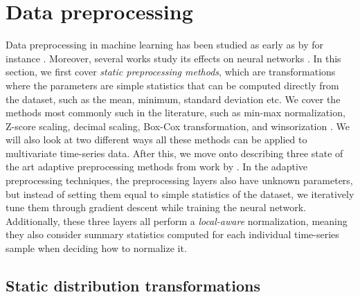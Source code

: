 \documentclass{statsmsc}
\begin{document}
{%

\section{Data preprocessing}%
\label{sec:Data preprocessing}

Data preprocessing in machine learning has been studied as early
as \citeyear{preprocess_origin} by for instance \citeauthor{preprocess_origin}.
Moreover, several works study its effects on neural networks \citep{stanislav, nawi, singh, hassan}.
In this section, we first cover \textit{static preprocessing methods}, which
are transformations where the parameters are simple statistics that can be
computed directly
from the dataset, such as the mean, minimum, standard deviation etc.
We cover the methods most commonly such in the literature, such as min-max
normalization, Z-score scaling, decimal scaling, Box-Cox transformation,
and winsorization \citep{stanislav, nawi, singh, hassan, winsorization}.
We will also look at two different ways all these methods can be applied to multivariate
time-series data.
%
After this, we move onto describing three state of the art adaptive
preprocessing methods from work by \cite{dain,rdain,bin}.
In the adaptive preprocessing techniques, the preprocessing layers also have
unknown parameters, but instead of setting them equal to simple statistics of
the dataset, we iteratively tune them through gradient descent while training the
neural network. Additionally, these three layers all
perform a \textit{local-aware} normalization, meaning they also consider
summary statistics computed for each individual time-series sample when
deciding how to normalize it.


\subsection{Static distribution transformations}%
\label{sub:Static distribution transformations}

}
\end{document}
